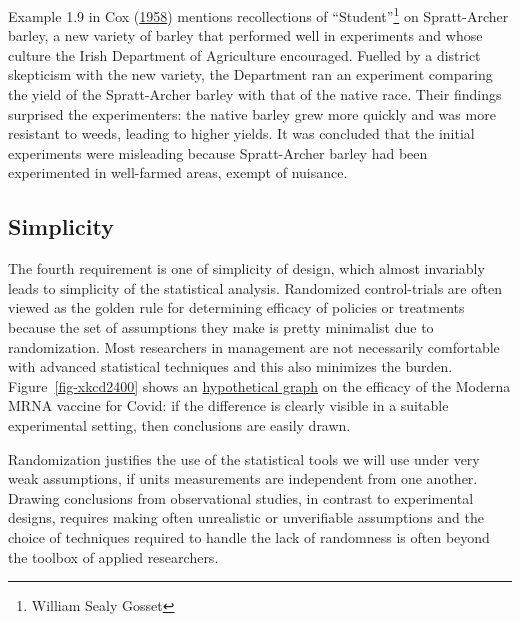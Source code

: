 \documentclass[
  11pt,
  letterpaper,
]{scrbook}
\theoremstyle{definition}
\theoremstyle{remark}
\begin{document}
Example 1.9 in Cox (\protect\hyperlink{ref-Cox:1958}{1958}) mentions
recollections of ``Student''\footnote{William Sealy Gosset} on
Spratt-Archer barley, a new variety of barley that performed well in
experiments and whose culture the Irish Department of Agriculture
encouraged. Fuelled by a district skepticism with the new variety, the
Department ran an experiment comparing the yield of the Spratt-Archer
barley with that of the native race. Their findings surprised the
experimenters: the native barley grew more quickly and was more
resistant to weeds, leading to higher yields. It was concluded that the
initial experiments were misleading because Spratt-Archer barley had
been experimented in well-farmed areas, exempt of nuisance.

\hypertarget{simplicity}{%
\subsection{Simplicity}\label{simplicity}}

The fourth requirement is one of simplicity of design, which almost
invariably leads to simplicity of the statistical analysis. Randomized
control-trials are often viewed as the golden rule for determining
efficacy of policies or treatments because the set of assumptions they
make is pretty minimalist due to randomization. Most researchers in
management are not necessarily comfortable with advanced statistical
techniques and this also minimizes the burden. Figure~\ref{fig-xkcd2400}
shows an
\href{https://www.zq1.de/~bernhard/images/share/mRNA-1273-trial.png}{hypothetical
graph} on the efficacy of the Moderna MRNA vaccine for Covid: if the
difference is clearly visible in a suitable experimental setting, then
conclusions are easily drawn.

Randomization justifies the use of the statistical tools we will use
under very weak assumptions, if units measurements are independent from
one another. Drawing conclusions from observational studies, in contrast
to experimental designs, requires making often unrealistic or
unverifiable assumptions and the choice of techniques required to handle
the lack of randomness is often beyond the toolbox of applied
researchers.
\end{document}
